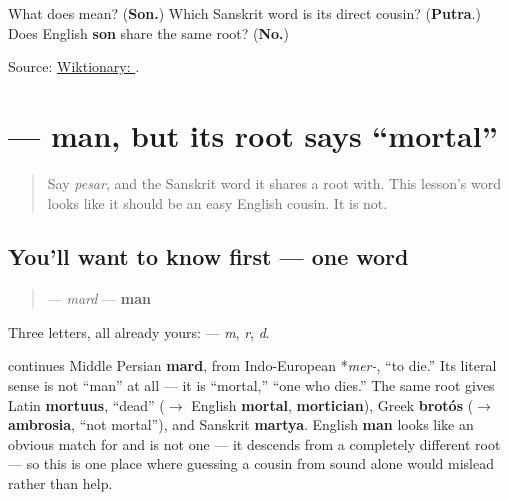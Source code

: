 \begin{tcolorbox}[breakable,colback=teal!4,colframe=teal!35!black,title={Before you move on}]
What does \textbf{} mean? (\textbf{Son.}) Which Sanskrit word is its direct cousin? (\textbf{Putra}.) Does English \textbf{son} share the same root? (\textbf{No.})

Source: \href{https://en.wiktionary.org/wiki/\%D9\%BE\%D8\%B3\%D8\%B1}{Wiktionary: }.
\end{tcolorbox}
\section[\texorpdfstring{\fa{مرد} (mard)}{مرد (mard)}]{ — man, but its root says \textquotedblleft{}mortal\textquotedblright{}}

\label{lesson:FA-C14-mard}



\begin{quote}
Say \emph{pesar}, and the Sanskrit word it shares a root with. This lesson's word looks like it should be an easy English cousin. It is not.
\end{quote}

\subsection*{You'll want to know first — one word}
\begin{quote}
\textbf{} — \emph{mard} — \textbf{man}
\end{quote}

Three letters, all already yours: \textbf{  } — \emph{m}, \emph{r}, \emph{d}.

\begin{cousinweb}
\textbf{} continues Middle Persian \textbf{mard}, from Indo-European *\emph{mer-}, \textquotedblleft{}to die.\textquotedblright{} Its literal sense is not \textquotedblleft{}man\textquotedblright{} at all — it is \textquotedblleft{}mortal,\textquotedblright{} \textquotedblleft{}one who dies.\textquotedblright{} The same root gives Latin \textbf{mortuus}, \textquotedblleft{}dead\textquotedblright{} ($\to$ English \textbf{mortal}, \textbf{mortician}), Greek \textbf{brotós} ($\to$ \textbf{ambrosia}, \textquotedblleft{}not mortal\textquotedblright{}), and Sanskrit \textbf{martya}. English \textbf{man} looks like an obvious match for \textbf{} and is not one — it descends from a completely different root — so this is one place where guessing a cousin from sound alone would mislead rather than help.
\end{cousinweb}

